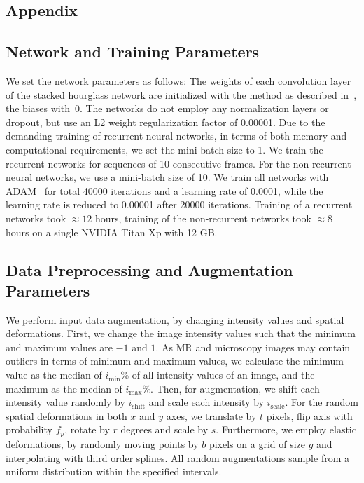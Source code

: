 \documentclass[runningheads,a4paper]{llncs}
\begin{document}



\begin{appendices}
\renewcommand{\thesection}{\arabic{section}}%


\chapter*{Appendix}

\section{Network and Training Parameters}
We set the network parameters as follows:
The weights of each convolution layer of the stacked hourglass network are initialized with the method as described in~\cite{He2015}, the biases with~0.
The networks do not employ any normalization layers or dropout, but use an L2 weight regularization factor of 0.00001.
Due to the demanding training of recurrent neural networks, in terms of both memory and computational requirements, we set the mini-batch size to 1.
We train the recurrent networks for sequences of 10 consecutive frames.
For the non-recurrent neural networks, we use a mini-batch size of 10.
We train all networks with ADAM~\cite{Kingma2015} for total 40000 iterations and a learning rate of 0.0001, while the learning rate is reduced to 0.00001 after 20000 iterations.
Training of a recurrent networks took $\approx12$ hours, training of the non-recurrent networks took $\approx8$ hours on a single NVIDIA Titan Xp with 12 GB.

\section{Data Preprocessing and Augmentation Parameters}

We perform input data augmentation, by changing intensity values and spatial deformations.
First, we change the image intensity values such that the minimum and maximum values are $-1$ and $1$.
As MR and microscopy images may contain outliers in terms of minimum and maximum values, we calculate the minimum value as the median of $i_{\text{min}}$\% of all intensity values of an image, and the maximum as the median of $i_{\text{max}}$\%.
Then, for augmentation, we shift each intensity value randomly by $i_{\text{shift}}$ and scale each intensity by $i_{\text{scale}}$.
For the random spatial deformations in both $x$ and $y$ axes, we translate by $t$ pixels, flip axis with probability $f_p$, rotate by $r$ degrees and scale by $s$.
Furthermore, we employ elastic deformations, by randomly moving points by $b$ pixels on a grid of size $g$ and interpolating with third order splines.
All random augmentations sample from a uniform distribution within the specified intervals.


\end{appendices}
\end{document}
